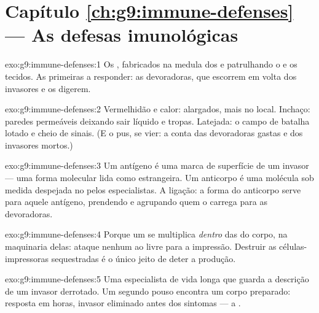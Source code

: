 \section*{Capítulo \ref{ch:g9:immune-defenses} --- As defesas imunológicas}

\begin{solution}{exo:g9:immune-defenses:1}
Os , fabricados na medula dos  e
patrulhando o  e os tecidos. As primeiras a responder:
as devoradoras, que escorrem em volta dos invasores e os
digerem.
\end{solution}

\begin{solution}{exo:g9:immune-defenses:2}
Vermelhidão e calor:  alargados, mais  no local.
Inchaço: paredes permeáveis deixando sair líquido e tropas.
Latejada: o campo de batalha lotado e cheio de sinais. (E o
pus, se vier: a conta das devoradoras gastas e dos invasores
mortos.)
\end{solution}

\begin{solution}{exo:g9:immune-defenses:3}
Um antígeno é uma marca de superfície de um invasor --- uma
forma molecular lida como estrangeira. Um anticorpo é uma
molécula sob medida despejada no  pelos especialistas.
A ligação: a forma do anticorpo serve para aquele antígeno,
prendendo e agrupando quem o carrega para as devoradoras.
\end{solution}

\begin{solution}{exo:g9:immune-defenses:4}
Porque um  se multiplica \emph{dentro} das  do
corpo, na maquinaria delas: ataque nenhum ao  livre para
a impressão. Destruir as células-impressoras sequestradas é o
único jeito de deter a produção.
\end{solution}

\begin{solution}{exo:g9:immune-defenses:5}
Uma especialista de vida longa que guarda a descrição de um
invasor derrotado. Um segundo pouso encontra um corpo
preparado: resposta em horas, invasor eliminado antes dos
sintomas --- a .
\end{solution}

